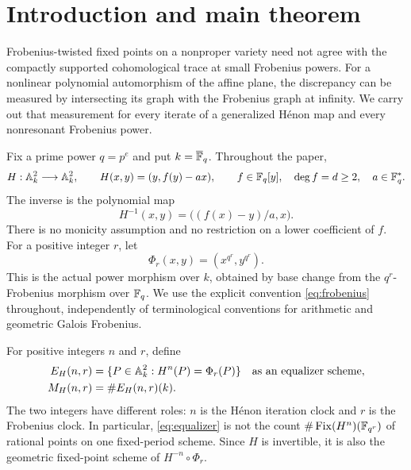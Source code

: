 \section{Introduction and main theorem}\label{sec:introduction}

Frobenius-twisted fixed points on a nonproper variety need not agree with
the compactly supported cohomological trace at small Frobenius powers.
For a nonlinear polynomial automorphism of the affine plane, the discrepancy
can be measured by intersecting its graph with the Frobenius graph at
infinity. We carry out that measurement for every iterate of a generalized
H\'enon map and every nonresonant Frobenius power.

Fix a prime power $q=p^e$ and put $k=\overline{\mathbb F}_q$. Throughout the paper,
\begin{equation}\label{eq:map}
 H:\mathbb A^2_k\longrightarrow\mathbb A^2_k,
 \qquad H(x,y)=(y,f(y)-ax),
 \qquad f\in\mathbb F_q[y],\quad \deg f=d\geq2,\quad a\in\mathbb F_q^*.
\end{equation}
The inverse is the polynomial map
\begin{equation}\label{eq:inverse}
 H^{-1}(x,y)=\bigl((f(x)-y)/a,x\bigr).
\end{equation}
There is no monicity assumption and no restriction on a lower coefficient
of $f$. For a positive integer $r$, let
\begin{equation}\label{eq:frobenius}
 \Phi_r(x,y)=(x^{q^r},y^{q^r}).
\end{equation}
This is the actual power morphism over $k$, obtained by base change from
the $q^r$-Frobenius morphism over $\mathbb F_q$. We use the explicit convention
\eqref{eq:frobenius} throughout, independently of terminological conventions
for arithmetic and geometric Galois Frobenius.

For positive integers $n$ and $r$, define
\begin{equation}\label{eq:equalizer}
 \begin{aligned}
 E_H(n,r)&=\{P\in\mathbb A^2_k:H^n(P)=\Phi_r(P)\}
       \quad\text{as an equalizer scheme},\\
 M_H(n,r)&=\#E_H(n,r)(k).
 \end{aligned}
\end{equation}
The two integers have different roles: $n$ is the H\'enon iteration clock
and $r$ is the Frobenius clock. In particular, \eqref{eq:equalizer} is not
the count $\#\operatorname{Fix}(H^n)(\mathbb F_{q^r})$ of rational points on one fixed-period
scheme. Since $H$ is invertible, it is also the geometric fixed-point scheme
of $H^{-n}\circ\Phi_r$.


